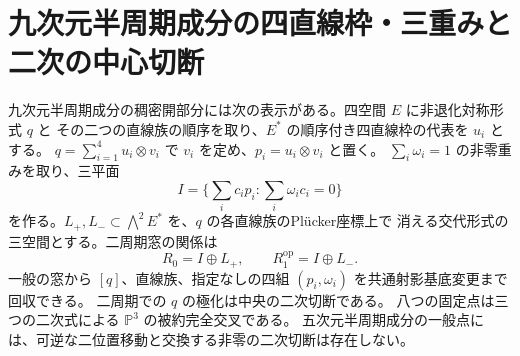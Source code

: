 \section{九次元半周期成分の四直線枠・三重みと二次の中心切断}
\label{sec:half-period-frame}
\begin{theorem}\label{thm:half-period-frame}
九次元半周期成分の稠密開部分には次の表示がある。四空間 $E$ に非退化対称形式 $q$ と
その二つの直線族の順序を取り、$E^*$ の順序付き四直線枠の代表を $u_i$ とする。
$q=\sum_{i=1}^4 u_i\otimes v_i$ で $v_i$ を定め、$p_i=u_i\otimes v_i$ と置く。
$\sum_i\omega_i=1$ の非零重みを取り、三平面
\[
 I=\{\textstyle\sum_i c_i p_i:\sum_i\omega_i c_i=0\}
\]
を作る。$L_+,L_-\subset\bigwedge^2 E^*$ を、$q$ の各直線族のPlücker座標上で
消える交代形式の三空間とする。二周期窓の関係は
\[
 R_0=I\oplus L_+,\qquad R_1^{\mathrm{op}}=I\oplus L_- .
\]
一般の窓から $[q]$、直線族、指定なしの四組 $(p_i,\omega_i)$ を共通射影基底変更まで回収できる。
二周期での $q$ の極化は中央の二次切断である。
八つの固定点は三つの二次式による $\mathbb P^3$ の被約完全交叉である。
五次元半周期成分の一般点には、可逆な二位置移動と交換する非零の二次切断は存在しない。
\end{theorem}
